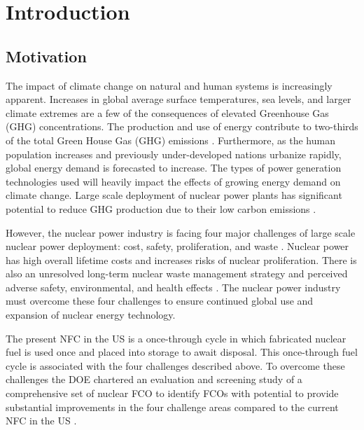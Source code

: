 \chapter[Introduction]{Introduction}
\label{chap:1}

\section{Motivation}

The impact of climate change on natural and human systems 
is increasingly apparent.
Increases in global average 
surface temperatures, sea levels, and larger climate extremes
are a few of the consequences of elevated Greenhouse Gas (GHG) 
concentrations.
The production and use of energy contribute to 
two-thirds of the total Green House Gas (GHG) 
emissions \cite{noauthor_climate_2018}.
Furthermore, as the human population increases and previously 
under-developed nations urbanize rapidly, 
global energy demand is forecasted to increase.  
The types of power generation technologies used 
will heavily impact the effects of growing energy demand 
on climate change.  
Large scale deployment of nuclear power plants has significant 
potential to reduce GHG production due to their low 
carbon emissions \cite{noauthor_climate_2018}.  

However, the nuclear power industry is facing four major challenges 
of large scale nuclear power deployment: 
cost, safety, proliferation, and waste 
\cite{massachusetts_institute_of_technology_future_2003}. 
Nuclear power has high overall lifetime costs and increases 
risks of nuclear proliferation. 
There is also an unresolved long-term nuclear waste management 
strategy and perceived adverse safety, environmental, and health 
effects \cite{massachusetts_institute_of_technology_future_2003}. 
The nuclear power industry must overcome these four challenges 
to ensure continued global use and expansion 
of nuclear energy technology. 

The present \gls{NFC} in the \gls{US} is a once-through cycle 
in which fabricated nuclear fuel is used once and placed into 
storage to await disposal. 
This once-through fuel cycle is associated with the four
challenges described above.
To overcome these challenges the 
\gls{DOE} chartered an evaluation and screening study 
of a comprehensive set of nuclear \gls{FCO} 
to identify \glspl{FCO} with potential 
to provide substantial improvements in the four challenge areas
compared to the current 
\gls{NFC} in the \gls{US} \cite{wigeland_nuclear_2014}. 

